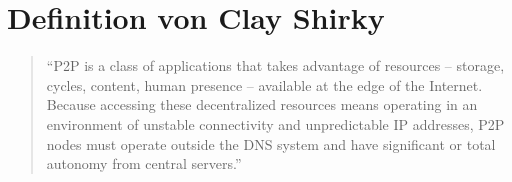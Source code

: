 \section{Definition von Clay Shirky}
\begin{quote}
"`P2P is a class of applications that takes advantage of resources – storage,
cycles, content, human presence – available at the edge of the Internet.
Because accessing these decentralized resources means operating in an
environment of unstable connectivity and unpredictable IP addresses, P2P
nodes must operate outside the DNS system and have significant or total
autonomy from central servers."'
\end{quote}
